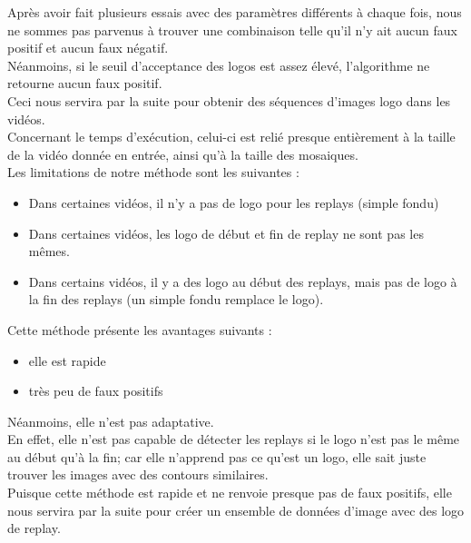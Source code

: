 \documentclass[11pt]{article}
\begin{document}
Après avoir fait plusieurs essais avec des paramètres différents à chaque fois, nous ne sommes pas parvenus à trouver une combinaison telle qu'il n'y ait aucun faux positif et aucun faux négatif.\\
Néanmoins, si le seuil d'acceptance des logos est assez élevé, l'algorithme ne retourne aucun faux positif.\\
Ceci nous servira par la suite pour obtenir des séquences d'images logo dans les vidéos.\\

Concernant le temps d’exécution, celui-ci est relié presque entièrement à la taille de la vidéo donnée en entrée, ainsi qu’à la taille des mosaiques.\\

Les limitations de notre méthode sont les suivantes :\\
\begin{itemize}
\item Dans certaines vidéos, il n’y a pas de logo pour les replays (simple fondu)\\
\item Dans certaines vidéos, les logo de début et fin de replay ne sont pas les mêmes.\\
\item Dans certains vidéos, il y a des logo au début des replays, mais pas de logo à la fin des replays (un simple fondu remplace le logo).\\
\end{itemize}

Cette méthode présente les avantages suivants :\\
\begin{itemize}
\item elle est rapide\\
\item très peu de faux positifs\\
\end{itemize}
Néanmoins, elle n'est pas adaptative.\\
En effet, elle n'est pas capable de détecter les replays si le logo n'est pas le même au début qu'à la fin; car elle n'apprend pas ce qu'est un logo, elle sait juste trouver les images avec des contours similaires.\\

Puisque cette méthode est rapide et ne renvoie presque pas de faux positifs, elle nous servira par la suite pour créer un ensemble de données d'image avec des logo de replay.\\
\end{document}
